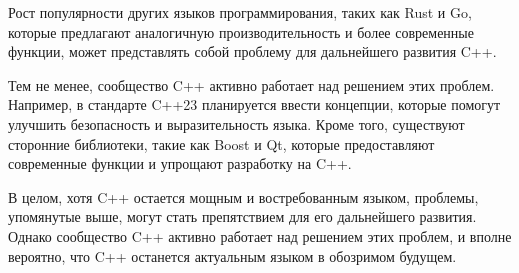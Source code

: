 Рост популярности других языков программирования, таких как Rust и Go, которые предлагают аналогичную производительность и более современные функции, может представлять собой проблему для дальнейшего развития C++.

Тем не менее, сообщество C++ активно работает над решением этих проблем. Например, в стандарте C++23 планируется ввести концепции, которые помогут улучшить безопасность и выразительность языка. Кроме того, существуют сторонние библиотеки, такие как Boost и Qt, которые предоставляют современные функции и упрощают разработку на C++.

В целом, хотя C++ остается мощным и востребованным языком, проблемы, упомянутые выше, могут стать препятствием для его дальнейшего развития. Однако сообщество C++ активно работает над решением этих проблем, и вполне вероятно, что C++ останется актуальным языком в обозримом будущем.